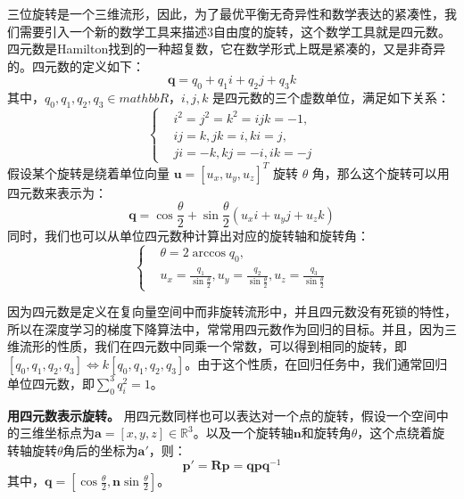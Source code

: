 三位旋转是一个三维流形，因此，为了最优平衡无奇异性和数学表达的紧凑性，我们需要引入一个新的数学工具来描述3自由度的旋转，这个数学工具就是四元数。四元数是Hamilton找到的一种超复数，它在数学形式上既是紧凑的，又是非奇异的。四元数的定义如下：
\begin{equation}
    \boldsymbol{q} = q_0 + q_1 i + q_2 j + q_3 k
\end{equation}
其中，$q_0, q_1, q_2, q_3 \in mathbb{R}$，$i, j, k$ 是四元数的三个虚数单位，满足如下关系：
\begin{equation}
    \left\{
    \begin{aligned}
        &i^2 = j^2 = k^2 = ijk = -1, \\
        &ij = k, jk = i, ki = j, \\
        &ji = -k, kj = -i, ik = -j
    \end{aligned}
    \right.
\end{equation}
假设某个旋转是绕着单位向量 $\boldsymbol{u} = [u_x, u_y, u_z]^T$ 旋转 $\theta$ 角，那么这个旋转可以用四元数来表示为：
\begin{equation}
    \boldsymbol{q} = \cos \frac{\theta}{2} + \sin \frac{\theta}{2} (u_x i + u_y j + u_z k)
\end{equation}
同时，我们也可以从单位四元数种计算出对应的旋转轴和旋转角：
\begin{equation}
    \left\{
    \begin{aligned}
        &\theta = 2 \arccos q_0, \\
        &u_x = \frac{q_1}{\sin \frac{\theta}{2}}, u_y = \frac{q_2}{\sin \frac{\theta}{2}}, u_z = \frac{q_3}{\sin \frac{\theta}{2}}
    \end{aligned}
    \right.
\end{equation}

因为四元数是定义在复向量空间中而非旋转流形中，并且四元数没有死锁的特性，所以在深度学习的梯度下降算法中，常常用四元数作为回归的目标。并且，因为三维流形的性质，我们在四元数中同乘一个常数，可以得到相同的旋转，即$[q_0, q_1, q_2, q_3] \iff k[q_0, q_1, q_2, q_3]$。由于这个性质，在回归任务中，我们通常回归单位四元数，即$\sum_0^3 q_i^2 = 1$。

{\bf 用四元数表示旋转。} 用四元数同样也可以表达对一个点的旋转，假设一个空间中的三维坐标点为$\boldsymbol{a} = [x, y, z] \in \mathbb{R}^3$。以及一个旋转轴$\boldsymbol{n}$和旋转角$\theta$，这个点绕着旋转轴旋转$\theta$角后的坐标为$\boldsymbol{a}'$，则：
\begin{equation}
    \boldsymbol{p}' = \boldsymbol{Rp} = \boldsymbol{qpq}^{-1}
\end{equation}
其中，$\boldsymbol{q} = [\cos \frac{\theta}{2}, \boldsymbol{n} \sin \frac{\theta}{2}]$。


